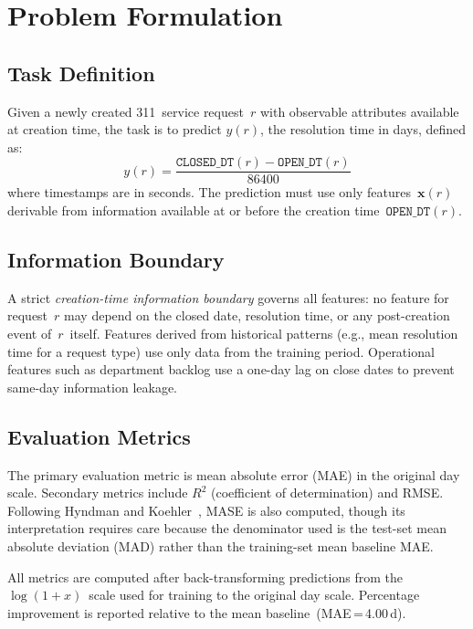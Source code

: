 \documentclass[sigconf,nonacm]{acmart}
\begin{document}
\section{Problem Formulation}
\label{sec:formulation}

\subsection{Task Definition}

Given a newly created 311~service request~$r$ with observable
attributes available at creation time, the task is to predict
$y(r)$, the resolution time in days, defined as:
\begin{equation}
y(r) = \frac{\texttt{CLOSED\_DT}(r) - \texttt{OPEN\_DT}(r)}{86400}
\end{equation}
where timestamps are in seconds. The prediction must use only
features~$\mathbf{x}(r)$ derivable from information available at
or before the creation time~$\texttt{OPEN\_DT}(r)$.

\subsection{Information Boundary}

A strict \emph{creation-time information boundary} governs all
features: no feature for request~$r$ may depend on the closed
date, resolution time, or any post-creation event of~$r$~itself.
Features derived from historical patterns (e.g., mean resolution
time for a request type) use only data from the training period.
Operational features such as department backlog use a one-day lag
on close dates to prevent same-day information leakage.

\subsection{Evaluation Metrics}

The primary evaluation metric is mean absolute error (MAE) in the
original day scale. Secondary metrics include $R^2$
(coefficient of determination) and RMSE. Following Hyndman and
Koehler~\cite{hyndman2006mase}, MASE is also computed, though
its interpretation requires care because the denominator used is
the test-set mean absolute deviation (MAD) rather than the
training-set mean baseline MAE.

All metrics are computed after back-transforming predictions from
the $\log(1+x)$~scale used for training to the original day
scale. Percentage improvement is reported relative to the mean
baseline~(MAE\,=\,4.00\,d).
\end{document}
